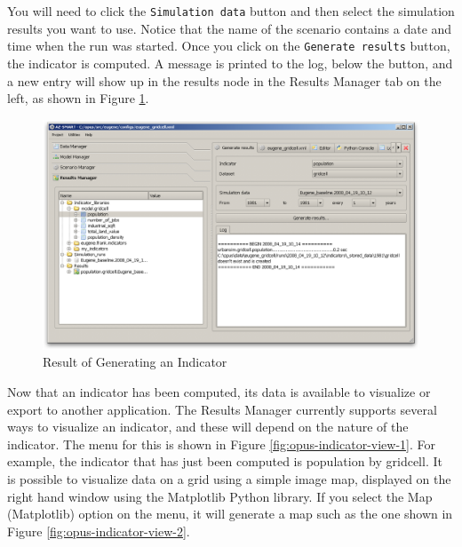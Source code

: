 You will need to click the \verb#Simulation data# button and then select the simulation results you want to use.  Notice that the name of the scenario contains a date and time when the run was started.  Once you click on the \verb#Generate results# button, the indicator is computed.  A message is printed to the log, below the button, and a new entry will show up in the results node in the Results Manager tab on the left, as shown in Figure \ref{fig:opus-indicator-2}.

\begin{figure}[htp]
\begin{center}
\includegraphics[scale=0.4]{graphics/opus-indicator-2.png}
\end{center}
\caption{Result of Generating an Indicator}
\label{fig:opus-indicator-2}
\end{figure}

Now that an indicator has been computed, its data is available to visualize or export to another application.  The Results Manager currently supports several ways to visualize an indicator, and these will depend on the nature of the indicator.  The menu for this is shown in Figure \ref{fig:opus-indicator-view-1}.  For example, the indicator that has just been computed is population by gridcell.  It is possible to visualize data on a grid using a simple image map, displayed on the right hand window using the Matplotlib Python library.   If you select the Map (Matplotlib) option on the menu, it will generate a map such as the one shown in Figure \ref{fig:opus-indicator-view-2}.

